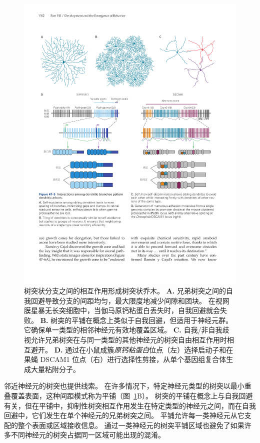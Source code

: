 \begin{figure}[htbp]
	\centering
	\includegraphics[width=1.0\linewidth]{chap47/fig_47_5}
	\caption{树突状分支之间的相互作用形成树突状乔木。
		\textbf{A.} 兄弟树突之间的自我回避导致分支的间距均匀，最大限度地减少间隙和团块。
		在视网膜星暴无长突细胞中，当伽马原钙粘蛋白丢失时，自我回避就会失败。
		\textbf{B.} 树突的平铺在概念上类似于自我回避，但适用于神经元群。
		它确保单一类型的相邻神经元有效地覆盖区域。
		\textbf{C.} 自我/非自我歧视允许兄弟树突在与同一类型的其他神经元的树突自由相互作用时相互避开。
		\textbf{D.} 通过在小鼠成簇\textit{原钙粘蛋白}位点（左）选择启动子和在果蝇 DSCAM1 位点（右）进行选择性剪接，从单个基因组复合体生成大量粘附分子。}
	\label{fig:47_5}
\end{figure}


邻近神经元的树突也提供线索。
在许多情况下，特定神经元类型的树突以最小重叠覆盖表面，这种间距模式称为平铺（图~\ref{fig:47_5}B）。
树突的平铺在概念上与自我回避有关，但在平铺中，抑制性树突相互作用发生在特定类型的神经元之间，而在自我回避中，它们发生在单个神经元的兄弟树突之间。
平铺允许每一类神经元从它支配的整个表面或区域接收信息。
通过一类神经元的树突平铺区域也避免了如果许多不同神经元的树突占据同一区域可能出现的混淆。


